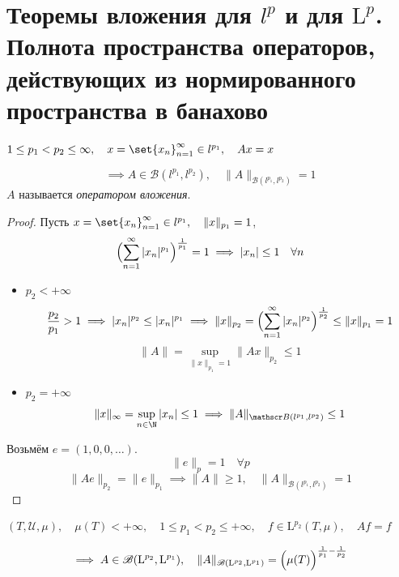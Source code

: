 \section{Теоремы вложения для \texorpdfstring{$ l^p $}{l\textasciicircum p} и для
\texorpdfstring{$ \mathrm L^p $}{пространств Лебега}.
Полнота пространства операторов, действующих из нормированного пространства в банахово}

\begin{theorem}
	$ 1 \le p_1 < p_2 \le \infty, \quad x = \set{x_n}_{n = 1}^\infty \in l^{p_1}, \quad Ax = x $

	$$ \implies A \in \mathscr B(l^{p_1}, l^{p_2}), \quad \|A\|_{\mathscr B(l^{p_1}, l^{p_2})} = 1 $$
	$ A $ называется \emph{оператором вложения}.
\end{theorem}

\begin{proof}
	Пусть $ x = \set{x_n}_{n = 1}^\infty \in l^{p_1}, \quad \|x\|_{p_1} = 1 $, \ie
	$$ \Bigl( \sum_{n = 1}^\infty |x_n|^{p_1} \Bigr)^{\frac1{p_1}} = 1 \implies
	|x_n| \le 1 \quad \forall n $$

	\begin{itemize}
		\item $ p_2 < +\infty $
			$$ \frac{p_2}{p_1} > 1 \implies
			|x_n|^{p_2} \le |x_n|^{p_1} \implies
			\|x\|_{p_2} = \Bigl( \sum_{n = 1}^\infty |x_n|^{p_2} \Bigr)^{\frac1{p_2}} \le
			\|x\|_{p_1} = 1 $$
			$$ \|A\| = \sup\limits_{\|x\|_{p_1} = 1}\|Ax\|_{p_2} \le 1 $$
		\item $ p_2 = +\infty $
			$$ \|x\|_\infty = \sup\limits_{n \in \N} |x_n| \le 1 \implies
			\|A\|_{\mathscr B(l^{p_1}, l^{p_2})} \le 1 $$
	\end{itemize}

	Возьмём $ e = (1, 0, 0, \dotsc) $.
	$$ \|e\|_p = 1 \quad \forall p $$
	$$ \|Ae\|_{p_2} = \|e\|_{p_1} \implies \|A\| \ge 1, \quad
	\|A\|_{\mathscr B(l^{p_1}, l^{p_2})} = 1 $$
\end{proof}

\begin{theorem}
	$ (T, \mathcal U, \mu), \quad \mu(T) < +\infty, \quad
	1 \le p_1 < p_2 \le +\infty, \quad
	f \in \mathrm L^{p_2}(T, \mu), \quad
	Af = f $

	$$ \implies A \in \mathscr B(\mathrm L^{p_2}, \mathrm L^{p_1}), \quad
	\|A\|_{\mathscr B(\mathrm L^{p_2}, \mathrm L^{p_1})} = \Bigl( \mu(T) \Bigr)^{\frac1{p_1} - \frac1{p_2}} $$
\end{theorem}

